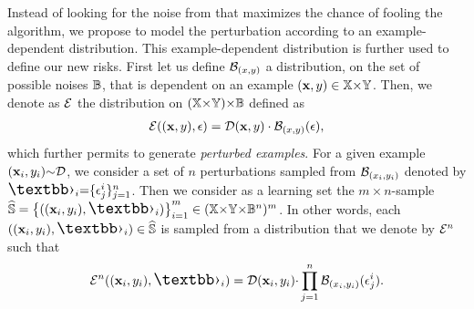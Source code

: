 Instead of looking for the noise from  that maximizes the chance of fooling the algorithm, we propose to model the perturbation according to an example-dependent distribution.
This example-dependent distribution is further used to define our new risks.
First let us define $\mathcal{B}_{(x,y)}$ a distribution, on the set of possible noises 
$\mathbb{B}$, that is dependent on an example $(\mathbf{x},y)\in\mathbb{X}{\times}\mathbb{Y}$. 
Then, we denote as ${\mathcal{E}}$ the distribution on $(\mathbb{X}{\times}\mathbb{Y}){\times}\mathbb{B}$ defined as
\begin{align*}
{\ensuremath{\mathcal{E}}}((\mathbf{x},y), \epsilon) = \mathcal{D}(\mathbf{x},y)\cdot\mathcal{B}_{(x,y)}(\epsilon),
\end{align*}
which further permits to generate \textit{perturbed examples}.
For a given example $(\mathbf{x}_i,y_i){\sim}\mathcal{D}$, we consider a set of $n$ perturbations sampled from $\mathcal{B}_{(x_i,y_i)}$ denoted by $\Epert_i{=}\{\epsilon^i_{j}\}_{j=1}^{n}$.
Then we consider as a learning set the \mbox{$m{\times} n$-sample} $\Spert=\LC ( (\x_i,\y_i), \Epert_i)\RC_{i=1}^\m \in (\X{\times}\Y{\times}\Xpert^n)^{\m}$.
In other words, each $( (\x_i,\y_i), \Epert_i)\in\Spert$ is sampled from a distribution that we denote by ${\mathcal{E}}^{n\!}$ such that
\begin{align*}
\Dpert^{n}((\x_i,\y_i), \Epert_i)=\D(\x_i,\y_i){\cdot}\prod_{j=1}^{n}\DXi(\epsilon^i_{j}).
\end{align*}

